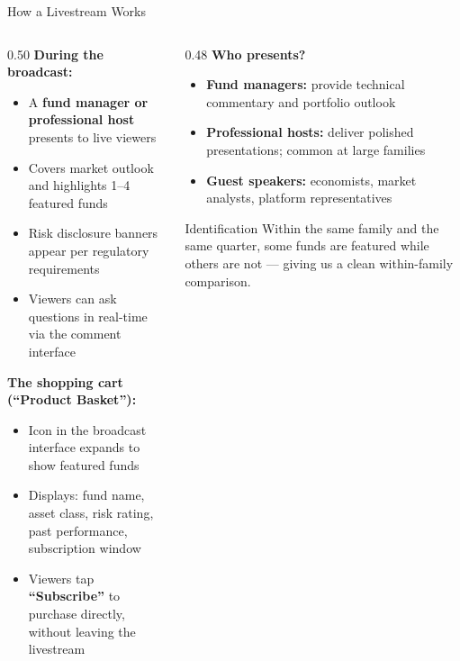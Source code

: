 \documentclass[11pt, aspectratio=169]{beamer}
\newcommand{\hl}[1]{\textcolor{myblue}{\textbf{#1}}}
\begin{document}

\begin{frame}{How a Livestream Works}

\begin{columns}[T]
\begin{column}{0.50\textwidth}
\textbf{During the broadcast:}
\begin{itemize}
  \item A \hl{fund manager or professional host} presents to live viewers
  \item Covers market outlook and highlights 1--4 featured funds
  \item Risk disclosure banners appear per regulatory requirements
  \item Viewers can ask questions in real-time via the comment interface
\end{itemize}

\vspace{0.25cm}
\textbf{The shopping cart (``Product Basket''):}
\begin{itemize}
  \item Icon in the broadcast interface expands to show featured funds
  \item Displays: fund name, asset class, risk rating,
  past performance, subscription window
  \item Viewers tap \hl{``Subscribe''} to purchase directly,
  without leaving the livestream
\end{itemize}
\end{column}
\begin{column}{0.48\textwidth}
\textbf{Who presents?}

\medskip
\begin{itemize}
  \item \textbf{Fund managers:} provide technical commentary
  and portfolio outlook
  \item \textbf{Professional hosts:} deliver polished presentations;
  common at large families
  \item \textbf{Guest speakers:} economists, market analysts,
  platform representatives
\end{itemize}

\vspace{0.3cm}
\begin{alertblock}{Identification}
  Within the same family and the same quarter, some funds are featured
  while others are not --- giving us a clean within-family comparison.
\end{alertblock}
\end{column}
\end{columns}

\end{frame}
\end{document}
